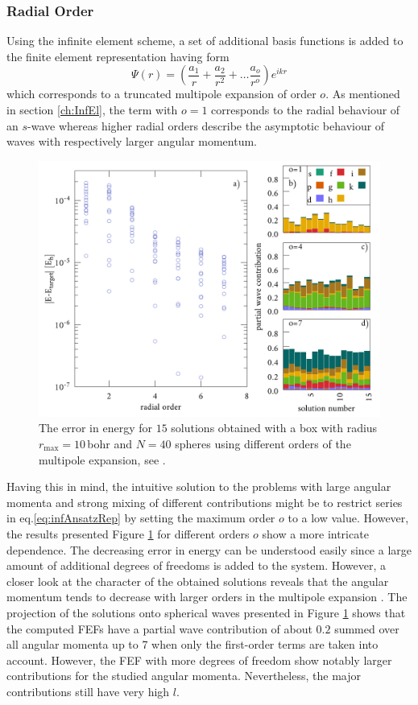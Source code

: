 \subsubsection{Radial Order}
Using the infinite element scheme, a set of additional basis functions is added to the finite element representation having form
\begin{equation} \label{eq:infAnsatzRep}
\Psi(r) = \left(\frac{a_1}{r} +\frac{a_2}{r^2} + \hdots \frac{a_{o}}{r^o} \right) e^{ikr}
\end{equation}
which corresponds to a truncated multipole expansion of order $o$.
As mentioned in section \ref{ch:InfEl}, the term with $o=1$ corresponds to the radial behaviour of an $s$-wave whereas higher radial orders describe the asymptotic behaviour of waves with respectively larger angular momentum.
\begin{figure}[h]
\includegraphics[width=\textwidth]{Figures/BC/OrdInfEL}
\caption{The error in energy for $15$ solutions obtained with a box with radius $r_\text{max}=10\,$bohr and $N=40$ spheres using different orders of the multipole expansion, see .}
\label{fig:InfOrd}
\end{figure}

Having this in mind, the intuitive solution to the problems with large angular momenta and strong mixing of different contributions might be to restrict series in eq.\ref{eq:infAnsatzRep} by setting the maximum order $o$ to a low value.
However, the results presented Figure \ref{fig:InfOrd} for different orders $o$ show a more intricate dependence.
The decreasing error in energy can be understood easily since a large amount of additional degrees of freedoms is added to the system.
However, a closer look at the character of the obtained solutions reveals that the angular momentum tends to decrease with larger orders in the multipole expansion .
The projection of the solutions onto spherical waves presented in Figure \ref{fig:InfOrd} shows that the computed FEFs have a partial wave contribution of about $0.2$ summed over all angular momenta up to 7 when only the first-order terms are taken into account.
However, the FEF with more degrees of freedom show notably larger contributions for the studied angular momenta.
Nevertheless, the major contributions still have very high $l$.


